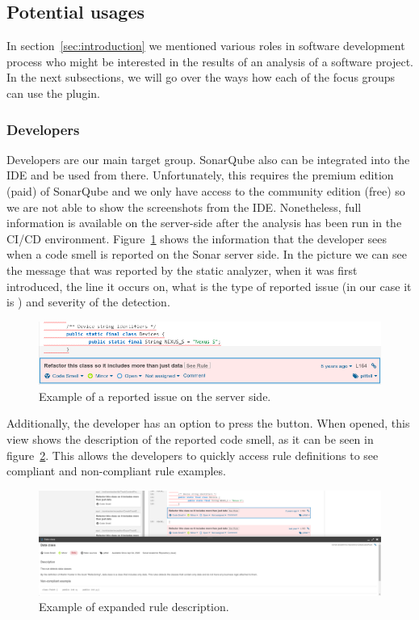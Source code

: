 \FloatBarrier

\subsection{Potential usages}\label{subsec:potential-usages}

In section~\ref{sec:introduction} we mentioned various roles in software development process who might be interested
in the results of an analysis of a software project.
In the next subsections, we will go over the ways how each of the focus groups can use the plugin.

\subsubsection{Developers}

Developers are our main target group.
SonarQube also can be integrated into the IDE and be used from there.
Unfortunately, this requires the premium edition (paid) of SonarQube and we only have access to the community edition (free)
so we are not able to show the screenshots from the IDE\@.
Nonetheless, full information is available on the server-side after the analysis has been run in the CI/CD environment.
Figure~\ref{fig:dev_1} shows the information that the developer sees when a code smell is reported on the Sonar server side.
In the picture we can see the message that was reported by the static analyzer, when it was first introduced,
the line it occurs on, what is the type of reported issue (in our case it is ) and severity of the detection.

\begin{figure}
    \includegraphics[scale=0.5]{figures/dev_1.png}
    \caption{Example of a reported issue on the server side.}
    \label{fig:dev_1}
\end{figure}

Additionally, the developer has an option to press the  button.
When opened, this view shows the description of the reported code smell, as it can be seen in figure~\ref{fig:dev_2}.
This allows the developers to quickly access rule definitions to see compliant and non-compliant rule examples.

\begin{figure}
    \includegraphics[scale=0.25]{figures/dev_2.png}
    \caption{Example of expanded rule description.}
    \label{fig:dev_2}
\end{figure}

